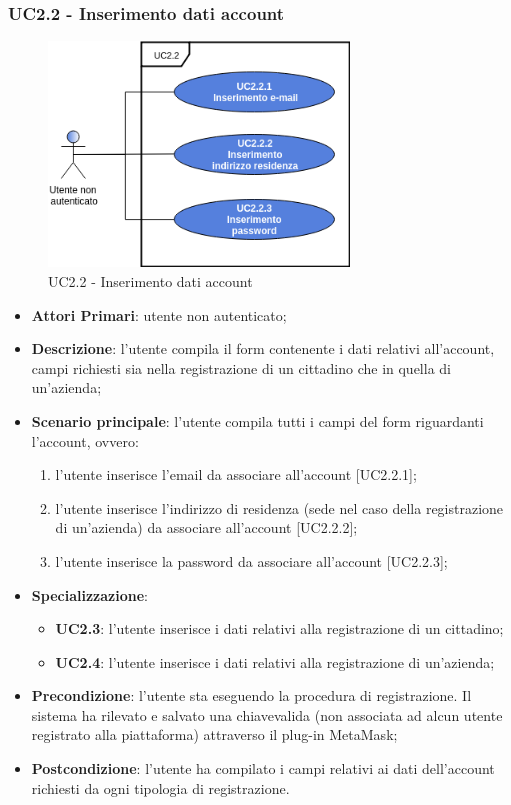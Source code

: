 \subsubsection{UC2.2 - Inserimento dati account}
\begin{figure}[h]
	\includegraphics[width=8cm]{res/images/UC2-2RegistrazioneGenerale.png}
	\centering
	\caption{UC2.2 - Inserimento dati account}
\end{figure}
\begin{itemize}
	\item \textbf{Attori Primari}: utente non autenticato;
	\item \textbf{Descrizione}: l'utente compila il form contenente i dati relativi all'account, campi richiesti sia nella registrazione di un cittadino che in quella di un'azienda;
	\item \textbf{Scenario principale}: l'utente compila tutti i campi del form riguardanti l'account, ovvero:
	\begin{enumerate}[label=\alph*.]
		\item l'utente inserisce l'email da associare all'account [UC2.2.1];
		\item l'utente inserisce l'indirizzo di residenza (sede nel caso della registrazione di un'azienda) da associare all'account [UC2.2.2];
		\item l'utente inserisce la password da associare all'account [UC2.2.3];
	\end{enumerate}
	\item \textbf{Specializzazione}:
	\begin{itemize}
		\item \textbf{UC2.3}: l'utente inserisce i dati relativi alla registrazione di un cittadino;
		\item \textbf{UC2.4}: l'utente inserisce i dati relativi alla registrazione di un'azienda;
		
	\end{itemize}
	\item \textbf{Precondizione}: l'utente sta eseguendo la procedura di registrazione. Il sistema ha rilevato e salvato una chiave\glosp valida (non associata ad alcun utente registrato alla piattaforma) attraverso il plug-in MetaMask\glo;
	\item \textbf{Postcondizione}: l'utente ha compilato i campi relativi ai dati dell'account richiesti da ogni tipologia di registrazione.
	
\end{itemize}
